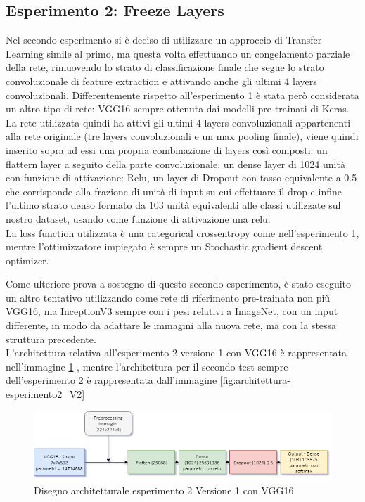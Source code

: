 \subsection{Esperimento 2: Freeze Layers}

Nel secondo esperimento si è deciso di utilizzare un approccio di Transfer Learning simile al primo, ma questa volta effettuando un congelamento parziale della rete, rimuovendo lo strato di classificazione finale che segue lo strato convoluzionale di feature extraction e attivando anche gli ultimi 4 layers convoluzionali.
Differentemente rispetto all'esperimento 1 è stata però considerata un altro tipo di rete: VGG16 sempre ottenuta dai modelli pre-trainati di Keras. \\
La rete utilizzata quindi ha attivi gli ultimi 4 layers convoluzionali appartenenti alla rete originale (tre layers convoluzionali e un max pooling finale), viene quindi inserito sopra ad essi una propria combinazione di layers così composti: un flattern layer a seguito della parte convoluzionale, un dense layer di 1024 unità con funzione di attivazione: Relu, un layer di Dropout con tasso equivalente a 0.5 che corrisponde alla frazione di unità di input su cui effettuare il drop e infine l'ultimo strato denso formato da 103 unità equivalenti alle classi utilizzate sul nostro dataset, usando come funzione di attivazione una relu.\\
La loss function utilizzata è una categorical crossentropy come nell'esperimento 1, mentre l'ottimizzatore impiegato è sempre un Stochastic gradient descent optimizer. \bigskip

Come ulteriore prova a sostegno di questo secondo esperimento, è stato eseguito un altro tentativo utilizzando come rete di riferimento pre-trainata non più VGG16, ma InceptionV3 sempre con i pesi relativi a ImageNet, con un input differente, in modo da adattare le immagini alla nuova rete, ma con la stessa struttura precedente. \\
L'architettura relativa all'esperimento 2 versione 1 con VGG16 è rappresentata nell'immagine \ref{fig:architettura-esperimento2_V1} , mentre l'architettura per il secondo test sempre dell'esperimento 2 è rappresentata dall'immagine \ref{fig:architettura-esperimento2_V2}

\begin{figure}
    \centering
    \includegraphics[width=1\textwidth]{./resources/AdvanceMachineLearningSchema-Esperimento2_V1.png}
    \caption{Disegno architetturale esperimento 2 Versione 1 con VGG16} 
    \label{fig:architettura-esperimento2_V1}
\end{figure}

